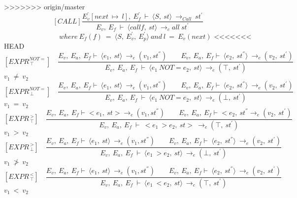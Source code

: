 >>>>>>> origin/master
	\[
	[CALL]
	\dfrac{E_v^{'}[next \ \mapsto \ l], \ E_f^{'} \ \vdash \ \langle S, \ st \rangle \ \rightarrow_{Call} \ st^{'}}{E_v, \ E_f \ \vdash \ \langle call f, \ st \rangle \ \rightarrow_call \ st^{'}}
	\]
	\begin{math}		
		\qquad \qquad \qquad \qquad where \ E_f(f) \ = \ \langle S, \ E_v^{'}, \ E_p^{'} \rangle \
		and \ l \ = \ E_v(next)
	\end{math}
<<<<<<< HEAD
	\[	
	[EXPR^{NOT=}_{\ \top}] \quad	
	\dfrac{E_v, \ E_a, \ E_f \vdash \ \langle e_1, \ st \rangle \ \rightarrow_e (v_1, st^{''}) \qquad E_v, \ E_a, \ E_f \vdash \ \langle e_2, \ st^{''} \rangle \ \rightarrow_e (v_2, \ st^{'})}{E_v, \ E_a, \ E_f \ \vdash \ \langle e_1 \ NOT= e_2, \ st \rangle \ \rightarrow_e (\top, \ st^{'})}	
	\]	
	\begin{math}		
		v_1 \ \not= \ v_2		
	\end{math} 
	\[
	[EXPR^{NOT=}_{\ \bot}] \quad	
	\dfrac{E_v, \ E_a, \ E_f \vdash \ \langle e_1, \ st \rangle \ \rightarrow_e (v_1, st^{''}) \qquad E_v, \ E_a, \ E_f \vdash \ \langle e_2, \ st^{''} \rangle \ \rightarrow_e (v_2, \ st^{'})}{E_v, \ E_a, \ E_f \ \vdash \ \langle e_1 \ NOT= e_2, \ st \rangle \ \rightarrow_e (\bot, \ st^{'})}	
	\]	
	\begin{math}		
		v_1 \ = \ v_2		
	\end{math} 
	\[	
	[EXPR^{\ >}_{\ \top}] \quad	
	\dfrac{E_v, \ E_a, \ E_f \vdash <e_1, \ st> \rightarrow_e (v_1, st^{''}) \qquad E_v, \ E_a, \ E_f \vdash <e_2, \ st^{''} \rightarrow_e (v_2, \ st^{'})}{E_v, \ E_a, \ E_f \ \vdash \ <e_1 \ > e_2, \ st> \ \rightarrow_e (\top, \ st^{'})}	
	\]
	\begin{math}		
		v_1 \ > \ v_2		
	\end{math} 
	\[	
	[EXPR^{\ >}_{\ \bot}] \quad	
	\dfrac{E_v, \ E_a, \ E_f \vdash \ \langle e_1, \ st \rangle \ \rightarrow_e (v_1, st^{''}) \qquad E_v, \ E_a, \ E_f \vdash \ \langle e_2, \ st^{''} \rangle \ \rightarrow_e (v_2, \ st^{'})}{E_v, \ E_a, \ E_f \ \vdash \ \langle e_1 \ > e_2, \ st \rangle \ \rightarrow_e (\bot, \ st^{'})}
	\]
	\begin{math}		
		v_1 \ \not> \ v_2		
	\end{math} 
	\[	
	[EXPR^{\ <}_{\ \top}] \quad	
	\dfrac{E_v, \ E_a, \ E_f \vdash \ \langle e_1, \ st \rangle \ \rightarrow_e (v_1, st^{''}) \qquad E_v, \ E_a, \ E_f \vdash \ \langle e_2, \ st^{''} \rangle \ \rightarrow_e (v_2, \ st^{'})}{E_v, \ E_a, \ E_f \ \vdash \ \langle e_1 \ < e_2, \ st \rangle \ \rightarrow_e (\top, \ st^{'})}
	\]
	\begin{math}		
		v_1 \ < \ v_2		
	\end{math} 
